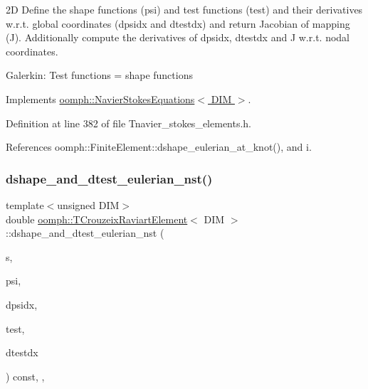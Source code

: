 2D Define the shape functions (psi) and test functions (test) and their derivatives w.\+r.\+t. global coordinates (dpsidx and dtestdx) and return Jacobian of mapping (J). Additionally compute the derivatives of dpsidx, dtestdx and J w.\+r.\+t. nodal coordinates.

Galerkin\+: Test functions = shape functions 

Implements \hyperlink{classoomph_1_1NavierStokesEquations_afbc63afd804f5143c74b0ca1be76ef82}{oomph\+::\+Navier\+Stokes\+Equations$<$ D\+I\+M $>$}.



Definition at line 382 of file Tnavier\+\_\+stokes\+\_\+elements.\+h.



References oomph\+::\+Finite\+Element\+::dshape\+\_\+eulerian\+\_\+at\+\_\+knot(), and i.

\mbox{\label{classoomph_1_1TCrouzeixRaviartElement_a8211f7a3299d128f877722b00097754f}} 
\subsubsection{\texorpdfstring{dshape\+\_\+and\+\_\+dtest\+\_\+eulerian\+\_\+nst()}{dshape\_and\_dtest\_eulerian\_nst()}}
{\footnotesize\ttfamily template$<$unsigned D\+IM$>$ \\
double \hyperlink{classoomph_1_1TCrouzeixRaviartElement}{oomph\+::\+T\+Crouzeix\+Raviart\+Element}$<$ D\+IM $>$\+::dshape\+\_\+and\+\_\+dtest\+\_\+eulerian\+\_\+nst (\begin{DoxyParamCaption}\item[{const \hyperlink{classoomph_1_1Vector}{Vector}$<$ double $>$ \&}]{s,  }\item[{\hyperlink{classoomph_1_1Shape}{Shape} \&}]{psi,  }\item[{\hyperlink{classoomph_1_1DShape}{D\+Shape} \&}]{dpsidx,  }\item[{\hyperlink{classoomph_1_1Shape}{Shape} \&}]{test,  }\item[{\hyperlink{classoomph_1_1DShape}{D\+Shape} \&}]{dtestdx }\end{DoxyParamCaption}) const\hspace{0.3cm}{\ttfamily [inline]}, {\ttfamily [protected]}, {\ttfamily [virtual]}}



